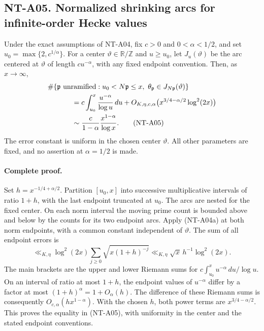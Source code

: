 \subsection*{NT-A05. Normalized shrinking arcs for infinite-order Hecke values}
Under the exact assumptions of NT-A04, fix
$c>0$ and $0<\alpha<1/2$, and set
$u_0=\max\{2,c^{1/\alpha}\}$.
For a center $\vartheta\in\mathbb R/\mathbb Z$ and $u\ge u_0$,
let $J_u(\vartheta)$ be the arc centered at $\vartheta$ of length
$cu^{-\alpha}$, with any fixed endpoint convention. Then, as $x\to\infty$,
\begin{align}
 &\#\{\mathfrak p\text{ unramified}:u_0<N\mathfrak p\le x,\
               \theta_{\mathfrak p}\in J_{N\mathfrak p}(\vartheta)\}
       \notag\\
 &\hspace{12mm}
   =c\int_{u_0}^x\frac{u^{-\alpha}}{\log u}\,du
       +O_{K,\eta,c,\alpha}
          \bigl(x^{3/4-\alpha/2}\log^2(2x)\bigr)
       \notag\\
 &\hspace{12mm}\sim\frac{c}{1-\alpha}\frac{x^{1-\alpha}}{\log x}.
                                                               \tag{NT-A05}
\end{align}
The error constant is uniform in the chosen center $\vartheta$.
All other parameters are fixed, and no assertion at $\alpha=1/2$
is made.

\paragraph{Complete proof.}
Set $h=x^{-1/4+\alpha/2}$. Partition $[u_0,x]$ into
successive multiplicative intervals of ratio $1+h$, with the
last endpoint truncated at $u_0$. The arcs are nested for the
fixed center. On each norm interval the moving prime count is
bounded above and below by the counts for its two endpoint arcs.
Apply (NT-A04a) at both norm endpoints, with a common constant
independent of $\vartheta$. The sum of all endpoint errors is
\[
 \ll_{K,\eta}\log^2(2x)
      \sum_{j\ge0}\sqrt{x(1+h)^{-j}}
 \ll_{K,\eta}\sqrt x\,h^{-1}\log^2(2x).
\]
The main brackets are the upper and lower Riemann sums for
$c\int_{u_0}^x u^{-\alpha}\,du/\log u$.
On an interval of ratio at most $1+h$, the endpoint values of
$u^{-\alpha}$ differ by a factor at most
$(1+h)^\alpha=1+O_\alpha(h)$. The difference of these Riemann
sums is consequently
$O_{c,\alpha}(h x^{1-\alpha})$.
With the chosen $h$, both power terms are $x^{3/4-\alpha/2}$.
This proves the equality in (NT-A05), with uniformity in the
center and the stated endpoint conventions.

